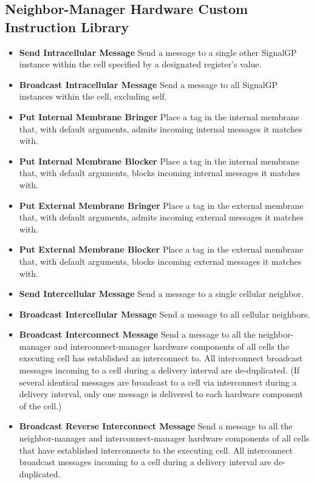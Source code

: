 \subsection{Neighbor-Manager Hardware Custom Instruction Library}

\begin{itemize}
\item \textbf{Send Intracellular Message}
Send a message to a single other SignalGP instance within the cell specified by a designated register's value.
\item \textbf{Broadcast Intracellular Message}
Send a message to all SignalGP instances within the cell, excluding self.
\item \textbf{Put Internal Membrane Bringer}
Place a tag in the internal membrane that, with default arguments, admits incoming internal messages it matches with.
\item \textbf{Put Internal Membrane Blocker}
Place a tag in the internal membrane that, with default arguments, blocks incoming internal messages it matches with.
\item \textbf{Put External Membrane Bringer}
Place a tag in the external membrane that, with default arguments, admits incoming external messages it matches with.
\item \textbf{Put External Membrane Blocker}
Place a tag in the external membrane that, with default arguments, blocks incoming external messages it matches with.
\item \textbf{Send Intercellular Message}
Send a message to a single cellular neighbor.
\item \textbf{Broadcast Intercellular Message}
Send a message to all cellular neighbors.
\item \textbf{Broadcast Interconnect Message}
Send a message to all the neighbor-manager and interconnect-manager hardware components of all cells the executing cell has established an interconnect to.
All interconnect broadcast messages incoming to a cell during a delivery interval are de-duplicated.
(If several identical messages are broadcast to a cell via interconnect during a delivery interval, only one message is delivered to each hardware component of the cell.)
\item \textbf{Broadcast Reverse Interconnect Message}
Send a message to all the neighbor-manager and interconnect-manager hardware components of all cells that have established interconnects to the executing cell.
All interconnect broadcast messages incoming to a cell during a delivery interval are de-duplicated.

\end{itemize}
